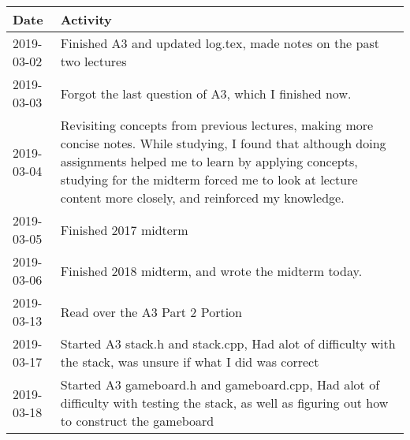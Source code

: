 \documentclass[12pt]{article}
\begin{document}
 \begin{tabular}{|p{2cm}| p{12cm}|} 
 \hline
 Date & Activity  \\ 
 
 \hline
        2019-03-02 & Finished A3 and updated log.tex, made notes on the past two lectures \\
 \hline
         2019-03-03 & Forgot the last question of A3, which I finished now. \\
 \hline
          2019-03-04 & Revisiting concepts from previous lectures, making more concise notes. While studying, I found that although doing assignments helped me to learn by applying concepts, studying for the midterm forced me to look at lecture content more closely, and reinforced my knowledge.  \\
 \hline
    2019-03-05 & Finished 2017 midterm  \\
 \hline
    2019-03-06 & Finished 2018 midterm, and wrote the midterm today.  \\
 \hline
     2019-03-13 & Read over the A3 Part 2 Portion  \\
 \hline
     2019-03-17 & Started A3 stack.h and stack.cpp, Had alot of difficulty with the stack, was unsure if what I did was correct \\
 \hline
      2019-03-18 & Started A3 gameboard.h and gameboard.cpp, Had alot of difficulty with testing the stack, as well as figuring out how to construct the gameboard \\
 \hline	
\end{tabular}
\end{document}
